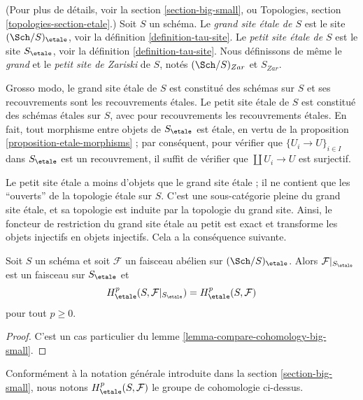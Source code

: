 \begin{definition}
\label{definition-big-etale-site}
(Pour plus de d\'etails, voir la section \ref{section-big-small}, ou
Topologies, section \ref{topologies-section-etale}.)
Soit $S$ un sch\'ema.
Le {\it grand site \'etale de $S$} est le site
$(\Sch/S)_\etale$, voir
la d\'efinition \ref{definition-tau-site}.
Le {\it petit site \'etale de $S$} est le site $S_\etale$, voir
la d\'efinition \ref{definition-tau-site}.
Nous d\'efinissons de m\^eme le {\it grand} et le {\it petit site de Zariski} de $S$,
not\'es $(\Sch/S)_{Zar}$ et $S_{Zar}$.
\end{definition}

\noindent
Grosso modo, le grand site \'etale de $S$ est constitu\'e des sch\'emas sur $S$
et ses recouvrements sont les recouvrements \'etales. Le petit site \'etale de $S$ est constitu\'e
des sch\'emas \'etales sur $S$, avec pour recouvrements les recouvrements \'etales.
En fait, tout morphisme entre objets de $S_\etale$ est \'etale, en
vertu de la
proposition \ref{proposition-etale-morphisms} ;
par cons\'equent, pour v\'erifier que $\{U_i \to U\}_{i \in I}$ dans $S_\etale$
est un recouvrement, il suffit de v\'erifier que $\coprod U_i \to U$ est surjectif.

\medskip\noindent
Le petit site \'etale a moins d'objets que le grand site \'etale ; il
ne contient que les ``ouverts'' de la topologie \'etale sur $S$. C'est une sous-cat\'egorie
pleine du grand site \'etale, et sa topologie est induite par la
topologie du grand site. Ainsi, le foncteur de restriction
du grand site \'etale au petit est exact et transforme les objets injectifs en
objets injectifs. Cela a la cons\'equence suivante.

\begin{proposition}
\label{proposition-cohomology-restrict-small-site}
Soit $S$ un sch\'ema et soit $\mathcal{F}$ un faisceau ab\'elien sur
$(\Sch/S)_\etale$.
Alors $\mathcal{F}|_{S_\etale}$ est un faisceau sur $S_\etale$ et
$$
H^p_\etale(S, \mathcal{F}|_{S_\etale}) =
H^p_\etale(S, \mathcal{F})
$$
pour tout $p \geq 0$.
\end{proposition}

\begin{proof}
C'est un cas particulier du lemme \ref{lemma-compare-cohomology-big-small}.
\end{proof}

\noindent
Conform\'ement \`a la notation g\'en\'erale introduite dans la
section \ref{section-big-small},
nous notons $H_\etale^p(S, \mathcal{F})$ le groupe de cohomologie ci-dessus.






